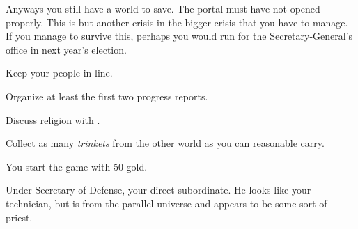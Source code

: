 \documentclass[char]{guildcamp3}
\begin{document}
Anyways you still have a world to save. The portal must have not opened properly. This is but another crisis in the bigger crisis that you have to manage. If you manage to survive this, perhaps you would run for the Secretary-General's office in next year's election.

\begin{itemz}[Goals]
  \item Keep your people in line.
  \item Organize at least the first two progress reports.
  \item Discuss religion with \cPaladin{}.
  \item Collect as many \emph{trinkets} from the other world as you can reasonable carry.
\end{itemz}

\begin{itemz}[Notes]
	\item You start the game with 50 gold. 
	\end{itemz}
\begin{contacts}
  \contact{\cPoliTwo{}} Under Secretary of Defense, your direct subordinate.
  \contact{\cPaladin{}} He looks like your technician, but is from the parallel universe and appears to be some sort of priest.
\end{contacts}
\end{document}
